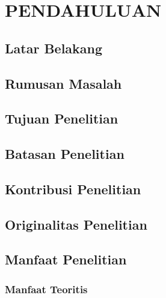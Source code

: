 \chapter{PENDAHULUAN}

\section{Latar Belakang}

\section{Rumusan Masalah}

\section{Tujuan Penelitian}

\section{Batasan Penelitian}

\section{Kontribusi Penelitian}

\section{Originalitas Penelitian}

\section{Manfaat Penelitian}
\subsection{Manfaat Teoritis}
